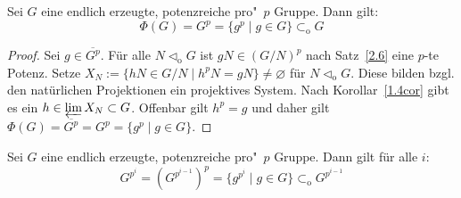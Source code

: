 \documentclass[11pt,a4paper,openany]{memoir}
\begin{document}
\iffalse
\begin{corollary}
Eine topologische Gruppe $G$ ist genau dann eine potenzreiche pro"~$p$ Gruppe, wenn $G$ ein projektiver Limes endlicher potenzreicher $p$-Gruppen ist, in der alle Ü\-ber\-gangs\-ab\-bil\-dun\-gen surjektiv sind.
\end{corollary}

\begin{proof}
Sei $G$ eine potenzreiche pro"~$p$ Gruppe. Dann ist $G\cong \varprojlim_{N\lhd_\text{o}G} G/N$ mit endlichen $p$-Gruppen $G/N$. Nach Satz~\ref{3.2} ist $G/N$ potenzreich. Sei umgekehrt $G=\varprojlim_{\lambda\in\Lambda}G_\lambda$. Dann ist $G$ eine pro"~$p$ Gruppe. Ist $K\lhd_\text{o}G$, so ist $G/K$ ein Quotient von gewissen $G_\lambda$, also potenzreich. Somit ist nach Satz~\ref{3.2} auch $G$ potenzreich.
\end{proof}
\fi

\begin{lemma}\label{3.4}
Sei $G$ eine endlich erzeugte, potenzreiche pro"~$p$ Gruppe. Dann gilt:
\[\Phi(G)=G^p=\{g^p\mid g\in G\}\subset_\text{o}G \]
\end{lemma}

\iffalse
\begin{proof}
Sei $g\in\overline{G^p}$. Dann ist $gN\in (G/N)^p$ für alle $N\lhd_\text{o}G$, also ist $gN$ eine $p$-te Potenz in $G/N$ nach Satz~\ref{2.6}. Also ist $g$ eine $p$-te Potenz in $G$ nach Lemma~\ref{Ex1.6}. Somit ist $\overline{G^p}\subset G^p$, also enthält $G^p=\overline{G^p}$ nur $p$-te Potenzen in $G$. Da $[G,G]\subset\overline{G^p}$, ist $G^p=\Phi(G)=P_2(G)$ und offen nach Satz~\ref{1.16}.
\end{proof}
\fi

\begin{proof}
Sei $g\in\overline{G^p}$. Für alle $N\lhd_\text{o}G$ ist $gN\in (G/N)^p$ nach Satz~\ref{2.6} eine $p$-te Potenz. Setze $X_N:=\{hN\in G/N\mid h^pN=gN \}\neq\varnothing$ für $N\lhd_\text{o}G$. Diese bilden bzgl. den natürlichen Projektionen ein projektives System. Nach Korollar~\ref{1.4cor} gibt es ein $h\in\varprojlim X_N\subset G$. Offenbar gilt $h^p=g$ und daher gilt $\Phi(G)= \overline{G^p}=G^p=\{g^p\mid g\in G\}$.
\end{proof}

\begin{corollary}\label{3.5}
Sei $G$ eine endlich erzeugte, potenzreiche pro"~$p$ Gruppe. Dann gilt für alle $i$:
\[G^{p^i}=(G^{p^{i-1}})^p=\{g^{p^i}\mid g\in G\}\subset_\text{o} G^{p^{i-1}} \]
\end{corollary}
\end{document}
